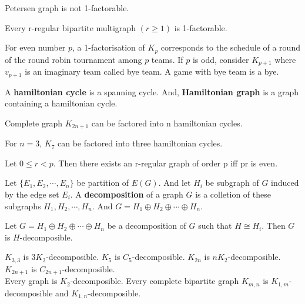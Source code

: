 \begin{theorem}
	Petersen graph is not 1-factorable.
\end{theorem}

\begin{theorem}
	Every r-regular bipartite multigraph $(r \ge 1)$ is 1-factorable.
\end{theorem}

\begin{remark}
	For even number $p$, a 1-factorisation of $K_p$ corresponds to the schedule of a round of the round robin tournament among $p$ teams.
	If $p$ is odd, consider $K_{p+1}$ where $v_{p+1}$ is an imaginary team called bye team.
	A game with bye team is a bye.
\end{remark}

\begin{definition}
	A \textbf{hamiltonian cycle} is a spanning cycle.
	And, \textbf{Hamiltonian graph} is a graph containing a hamiltonian cycle.
\end{definition}

\begin{theorem}
	Complete graph $K_{2n+1}$ can be factored into n hamiltonian cycles.
\end{theorem}

\begin{remark}
	For $n=3$, $K_7$ can be factored into three hamiltonian cycles.
\end{remark}

\begin{theorem}
	Let $0 \le r < p$.
	Then there exists an r-regular graph of order p iff pr is even.
\end{theorem}

\begin{definition}
	Let $\{E_1, E_2, \cdots, E_n \}$ be partition of $E(G)$.
	And let $H_i$ be subgraph of $G$ induced by the edge set $E_i$.
	A \textbf{decomposition} of a graph $G$ is a colletion of these subgraphs $H_1, H_2, \cdots, H_n$.
	And $G = H_1 \oplus H_2 \oplus \cdots \oplus H_n$.
\end{definition}

\begin{definition}
	Let $G = H_1 \oplus H_2 \oplus \cdots \oplus H_n$ be a decomposition of $G$ such that $H \cong H_i$.
	Then $G$ is $H$-decomposible.
\end{definition}

\begin{remark}
	$K_{3,3}$ is $3K_2$-decomposible.
	$K_5$ is $C_5$-decomposible.
	$K_{2n}$ is $nK_2$-decomposible.
	$K_{2n+1}$ is $C_{2n+1}$-decomposible.\\
	Every graph is $K_2$-decomposible.
	Every complete bipartite graph $K_{m,n}$ is $K_{1,m}$-decomposible and $K_{1,n}$-decomposible.
\end{remark}

